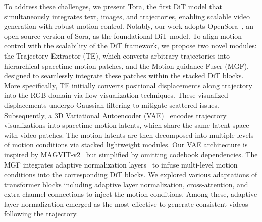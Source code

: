 To address these challenges, we present Tora, the first DiT model that simultaneously integrates text, images, and trajectories, enabling scalable video generation with robust motion control.
Notably, our work adopts OpenSora~\cite{OpenSora}, an open-source version of Sora, as the foundational DiT model. To align motion control with the scalability of the DiT framework, we propose two novel modules: the Trajectory Extractor (TE), which converts arbitrary trajectories into hierarchical spacetime motion patches, and the Motion-guidance Fuser (MGF), designed to seamlessly integrate these patches within the stacked DiT blocks.
More specifically, TE initially converts positional displacements along trajectory into the RGB domain via flow visualization techniques. These visualized displacements undergo Gaussian filtering to mitigate scattered issues. Subsequently, a 3D Variational Autoencoder (VAE)~\cite{kingma2013auto} encodes trajectory visualizations into spacetime motion latents, which share the same latent space with video patches. The motion latents are then decomposed into multiple levels of motion conditions via stacked lightweight modules. Our VAE architecture is inspired by MAGVIT-v2~\cite{DBLP:journals/corr/abs-2310-05737} but simplified by omitting codebook dependencies. The MGF integrates adaptive normalization layers~\cite{DBLP:conf/aaai/PerezSVDC18} to infuse multi-level motion conditions into the corresponding DiT blocks. We explored various adaptations of transformer blocks including adaptive layer normalization, cross-attention, and extra channel connections to inject the motion conditions. Among these, adaptive layer normalization emerged as the most effective to generate consistent videos following the trajectory.

